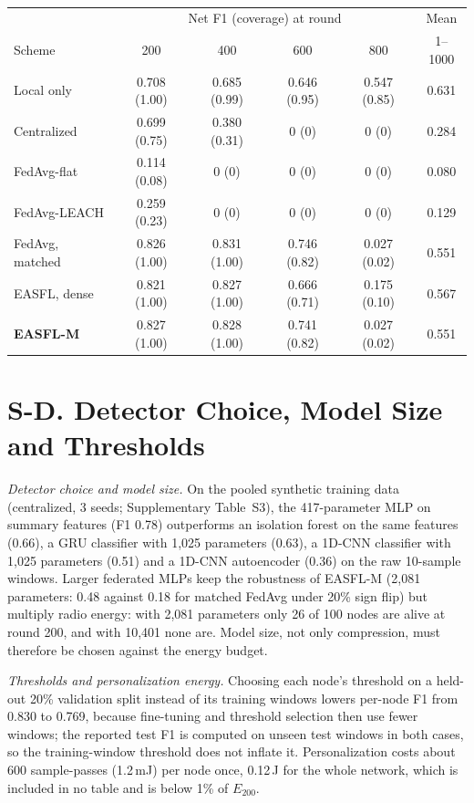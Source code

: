 \begin{table}[h]
\caption{}\label{tab:s7}
\centering\scriptsize\setlength{\tabcolsep}{1.5pt}
\begin{tabular}{@{}lccccc@{}}
\toprule
 & \multicolumn{4}{c}{Net F1 (coverage) at round} & Mean\\
Scheme & 200 & 400 & 600 & 800 & 1--1000\\
\midrule
Local only & 0.708 (1.00) & 0.685 (0.99) & 0.646 (0.95) & 0.547 (0.85) & 0.631\\
Centralized & 0.699 (0.75) & 0.380 (0.31) & 0 (0) & 0 (0) & 0.284\\
FedAvg-flat & 0.114 (0.08) & 0 (0) & 0 (0) & 0 (0) & 0.080\\
FedAvg-LEACH & 0.259 (0.23) & 0 (0) & 0 (0) & 0 (0) & 0.129\\
FedAvg, matched & 0.826 (1.00) & 0.831 (1.00) & 0.746 (0.82) & 0.027 (0.02) & 0.551\\
EASFL, dense & 0.821 (1.00) & 0.827 (1.00) & 0.666 (0.71) & 0.175 (0.10) & 0.567\\
\textbf{EASFL-M} & 0.827 (1.00) & 0.828 (1.00) & 0.741 (0.82) & 0.027 (0.02) & 0.551\\
\bottomrule
\end{tabular}
\end{table}
\section*{S-D. Detector Choice, Model Size and Thresholds}
\textit{Detector choice and model size.} On the pooled synthetic training data (centralized, 3 seeds; Supplementary Table~S3), the 417-parameter MLP on summary features (F1 0.78) outperforms an isolation forest on the same features (0.66), a GRU classifier with 1{,}025 parameters (0.63), a 1D-CNN classifier with 1{,}025 parameters (0.51) and a 1D-CNN autoencoder (0.36) on the raw 10-sample windows. Larger federated MLPs keep the robustness of EASFL-M (2{,}081 parameters: 0.48 against 0.18 for matched FedAvg under 20\% sign flip) but multiply radio energy: with 2{,}081 parameters only 26 of 100 nodes are alive at round 200, and with 10{,}401 none are. Model size, not only compression, must therefore be chosen against the energy budget.

\textit{Thresholds and personalization energy.} Choosing each node's threshold on a held-out 20\% validation split instead of its training windows lowers per-node F1 from 0.830 to 0.769, because fine-tuning and threshold selection then use fewer windows; the reported test F1 is computed on unseen test windows in both cases, so the training-window threshold does not inflate it. Personalization costs about 600 sample-passes (1.2\,mJ) per node once, 0.12\,J for the whole network, which is included in no table and is below 1\% of $E_{200}$.



